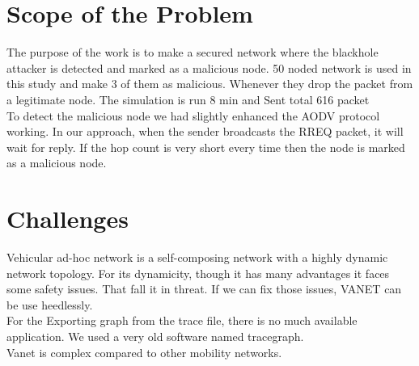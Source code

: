 \section{Scope of the Problem}

The purpose of the work is to make a secured network where the blackhole attacker is detected and marked as a malicious node. 50 noded network is used in this study and make 3 of them as malicious. Whenever they drop the packet from a legitimate node. The simulation is run 8 min and Sent total 616 packet \\
To detect the malicious node we had slightly
enhanced the AODV protocol working. In our approach, when
the sender broadcasts the RREQ packet, it will wait for reply.
If the hop count is very short every time then the node is marked as a malicious node.

\section{Challenges}

Vehicular ad-hoc network is a self-composing network with a highly dynamic network topology. For its dynamicity, though
it has many advantages it faces some safety issues. That fall it in threat. If we can fix those issues, VANET can be use
heedlessly.\\
For the Exporting graph from the trace file, there is no much available application. We used a very old software named
tracegraph.\\
Vanet is complex compared to other mobility networks.
